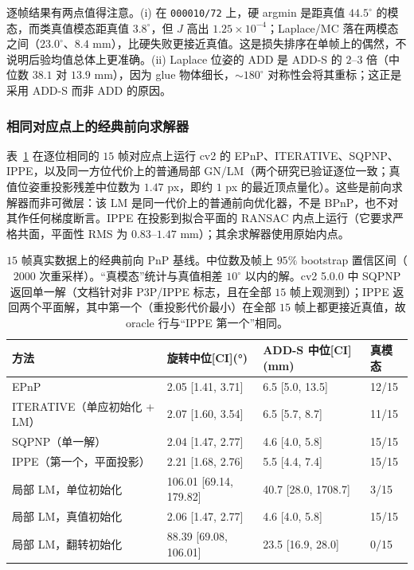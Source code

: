 逐帧结果有两点值得注意。(i) 在 \texttt{000010/72} 上，硬 argmin 是距真值 $44.5^\circ$ 的模态，而类真值模态距真值 $3.8^\circ$，但 $J$ 高出 $1.25\times10^{-4}$；Laplace/MC 落在两模态之间（$23.0^\circ$、$8.4$ mm），比硬失败更接近真值。这是损失排序在单帧上的偶然，不说明后验均值总体上更准确。(ii) Laplace 位姿的 ADD 是 ADD-S 的 $2$--$3$ 倍（中位数 $38.1$ 对 $13.9$ mm），因为 glue 物体细长，$\sim180^\circ$ 对称性会将其重标；这正是采用 ADD-S 而非 ADD 的原因。

\subsubsection{相同对应点上的经典前向求解器}\label{sec:classical}

表~\ref{tab:classical} 在逐位相同的 $15$ 帧对应点上运行 cv2 的 EPnP、ITERATIVE、SQPNP、IPPE，以及同一方位代价上的普通局部 GN/LM（两个研究已验证逐位一致；真值位姿重投影残差中位数为 $1.47$ px，即约 $1$ px 的最近顶点量化）。这些是前向求解器而非可微层：该 LM 是同一代价上的普通前向优化器，不是 BPnP，也不对其作任何梯度断言。IPPE 在投影到拟合平面的 RANSAC 内点上运行（它要求严格共面，平面性 RMS 为 $0.83$--$1.47$ mm）；其余求解器使用原始内点。

\begin{table}[t]
\centering
\caption{$15$ 帧真实数据上的经典前向 PnP 基线。中位数及帧上 $95\%$ bootstrap 置信区间（$2000$ 次重采样）。“真模态”统计与真值相差 $10^\circ$ 以内的解。cv2 5.0.0 中 SQPNP 返回单一解（文档针对非 P3P/IPPE 标志，且在全部 $15$ 帧上观测到）；IPPE 返回两个平面解，其中第一个（重投影代价最小）在全部 $15$ 帧上都更接近真值，故 oracle 行与“IPPE 第一个”相同。}
\label{tab:classical}
\scriptsize
\setlength{\tabcolsep}{4pt}
\begin{tabular}{@{}l l l l@{}}
\toprule
方法 & 旋转中位[CI](°) & ADD-S 中位[CI](mm) & 真模态\\
\midrule
EPnP & 2.05 [1.41, 3.71] & 6.5 [5.0, 13.5] & 12/15\\
ITERATIVE（单应初始化 + LM） & 2.07 [1.60, 3.54] & 6.5 [5.7, 8.7] & 11/15\\
SQPNP（单一解） & 2.04 [1.47, 2.77] & 4.6 [4.0, 5.8] & 15/15\\
IPPE（第一个，平面投影） & 2.21 [1.68, 2.76] & 5.5 [4.4, 7.4] & 15/15\\
局部 LM，单位初始化 & 106.01 [69.14, 179.82] & 40.7 [28.0, 1708.7] & 3/15\\
局部 LM，真值初始化 & 2.06 [1.47, 2.77] & 4.6 [4.0, 5.8] & 15/15\\
局部 LM，翻转初始化 & 88.39 [69.08, 106.01] & 23.5 [16.9, 28.0] & 0/15\\
\bottomrule
\end{tabular}
\end{table}


